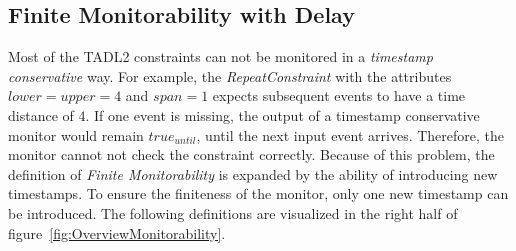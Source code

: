 	\subsection{Finite Monitorability with Delay}
		Most of the TADL2 constraints can not be monitored in a \emph{timestamp conservative} way. For example, the \emph{RepeatConstraint} with the attributes $lower=upper=4$ and $span=1$ expects subsequent events to have a time distance of $4$. If one event is missing, the output of a timestamp conservative monitor would remain $true_{until}$, until the next input event arrives. Therefore, the monitor cannot not check the constraint correctly. Because of this problem, the definition of \emph{Finite Monitorability} is expanded by the ability of introducing new timestamps. To ensure the finiteness of the monitor, only one new timestamp can be introduced. The following definitions are visualized in the right half of figure~\ref{fig:OverviewMonitorability}.
